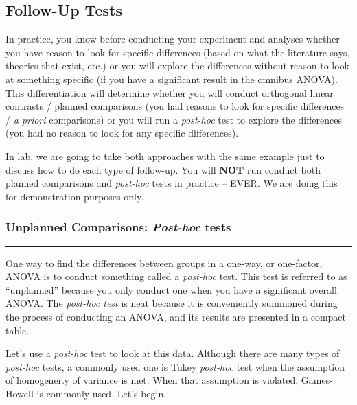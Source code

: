 \documentclass[
]{book}
\begin{document}
\hypertarget{follow-up-tests-1}{%
\subsection{Follow-Up Tests}\label{follow-up-tests-1}}

In practice, you know before conducting your experiment and analyses whether you have reason to look for specific differences (based on what the literature says, theories that exist, etc.) or you will explore the differences without reason to look at something specific (if you have a significant result in the omnibus ANOVA). This differentiation will determine whether you will conduct orthogonal linear contrasts / planned comparisons (you had reasons to look for specific differences / \emph{a priori} comparisons) or you will run a \emph{post-hoc} test to explore the differences (you had no reason to look for any specific differences).

In lab, we are going to take both approaches with the same example just to discuss how to do each type of follow-up. You will \textbf{NOT} run conduct both planned comparisons and \emph{post-hoc} tests in practice -- EVER. We are doing this for demonstration purposes only.

\hypertarget{unplanned-comparisons-post-hoc-tests-1}{%
\subsubsection{\texorpdfstring{Unplanned Comparisons: \emph{Post-hoc} tests}{Unplanned Comparisons: Post-hoc tests}}\label{unplanned-comparisons-post-hoc-tests-1}}

\begin{center}\rule{0.5\linewidth}{0.5pt}\end{center}

One way to find the differences between groups in a one-way, or one-factor, ANOVA is to conduct something called a \emph{post-hoc} test. This test is referred to as ``unplanned'' because you only conduct one when you have a significant overall ANOVA. The \emph{post-hoc test} is neat because it is conveniently summoned during the process of conducting an ANOVA, and its results are presented in a compact table.

Let's use a \emph{post-hoc} test to look at this data. Although there are many types of \emph{post-hoc} tests, a commonly used one is Tukey \emph{post-hoc} test when the assumption of homogeneity of variance is met. When that assumption is violated, Games-Howell is commonly used. Let's begin.
\end{document}
